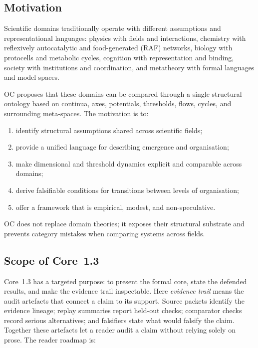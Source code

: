\subsection{Motivation}

Scientific domains traditionally operate with different assumptions and
representational languages: physics with fields and interactions, chemistry
with reflexively autocatalytic and food-generated (RAF) networks,
biology with protocells and metabolic cycles, cognition with representation and
binding, society with institutions and coordination, and metatheory with
formal languages and model spaces.

OC proposes that these domains can be compared through a single structural
ontology based on continua, axes, potentials, thresholds, flows, cycles, and
surrounding meta-spaces. The motivation is to:

\begin{enumerate}
    \item identify structural assumptions shared across scientific fields;
    \item provide a unified language for describing emergence and organisation;
    \item make dimensional and threshold dynamics explicit and comparable across domains;
    \item derive falsifiable conditions for transitions between levels of organisation;
    \item offer a framework that is empirical, modest, and non-speculative.
\end{enumerate}

OC does not replace domain theories; it exposes their structural substrate and prevents category mistakes when comparing systems across fields.

\subsection{Scope of Core~1.3}

Core~1.3 has a targeted purpose: to present the formal core, state the defended
results, and make the evidence trail inspectable. Here \emph{evidence trail}
means the audit artefacts that connect a claim to its support. Source packets
identify the evidence lineage; replay summaries report held-out checks; comparator
checks record serious alternatives; and falsifiers state what would falsify
the claim. Together these artefacts let a reader audit a claim without relying
solely on prose. The reader roadmap is:

